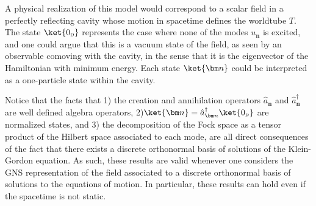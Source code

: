 \documentclass[letterpaper,12pt,titlepage,oneside,final]{book}
\newcommand{\tc}[1]{\textsc{#1}}
\begin{document}




A physical realization of this model would correspond to a scalar field in a perfectly reflecting cavity whose motion in spacetime defines the worldtube $T$. The state $\ket{0_\tc{d}}$ represents the case where none of the modes $u_{\bm n}$ is excited, and one could argue that this is a vacuum state of the field, as seen by an observable comoving with the cavity, in the sense that it is the eigenvector of the Hamiltonian with minimum energy. Each state $\ket{\bm n}$ could be interpreted as a one-particle state within the cavity.

Notice that the facts that 1) the creation and annihilation operators $\hat{a}_{\bm n}$ and $\hat{a}_{\bm n}^\dagger$ are well defined algebra operators, 2)$\ket{\bm n} = \hat{a}_{\bm n}^\dagger \ket{0_\tc{d}}$ are normalized states, and 3) the decomposition of the Fock space as a tensor product of the Hilbert space associated to each mode, are all direct consequences of the fact that there exists a discrete orthonormal basis of solutions of the Klein-Gordon equation. As such, these results are valid whenever one considers the GNS representation of the field associated to a discrete orthonormal basis of solutions to the equations of motion. In particular, these results can hold even if the spacetime is not static.
\end{document}
